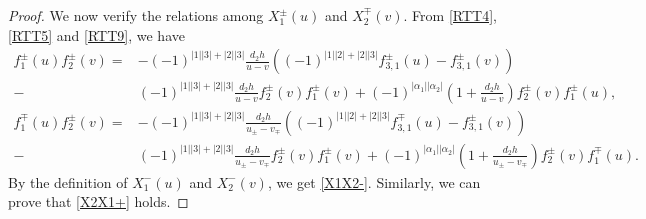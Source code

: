 \documentclass[a4paper,12pt]{article}
\numberwithin{equation}{section}
\begin{document}
\begin{proof}
We now verify the relations among $X_{1}^{\pm}(u)$ and $X_{2}^{\mp}(v)$. From \eqref{RTT4}, \eqref{RTT5} and \eqref{RTT9}, we have
\begin{align*}
f_{1}^{\pm}(u)f_{2}^{\pm}(v)=&-(-1)^{|1||3|+|2||3|}\frac{d_{2}h}{u-v}
\left((-1)^{|1||2|+|2||3|}f_{3,1}^{\pm}(u)-f_{3,1}^{\pm}(v)\right)\\
-&(-1)^{|1||3|+|2||3|}\frac{d_{2}h}{u-v}
f_{2}^{\pm}(v)f_{1}^{\pm}(v)+(-1)^{|\alpha_{1}||\alpha_{2}|}\left(1+\frac{d_{2}h}{u-v}\right)
f_{2}^{\pm}(v)f_{1}^{\pm}(u),\\
f_{1}^{\mp}(u)f_{2}^{\pm}(v)=&-(-1)^{|1||3|+|2||3|}\frac{d_{2}h}{u_{\pm}-v_{\mp}}
\left((-1)^{|1||2|+|2||3|}f_{3,1}^{\mp}(u)-f_{3,1}^{\pm}(v)\right)\\
-&(-1)^{|1||3|+|2||3|}\frac{d_{2}h}
{u_{\pm}-v_{\mp}}f_{2}^{\pm}(v)f_{1}^{\pm}(v)+(-1)^{|\alpha_{1}||\alpha_{2}|}\left(1+\frac{d_{2}h}{u_{\pm}-v_{\mp}}\right)
f_{2}^{\pm}(v)f_{1}^{\mp}(u).
\end{align*}
By the definition of $X_{1}^{-}(u)$ and $X_{2}^{-}(v)$, we get \eqref{X1X2-}. Similarly, we can prove that \eqref{X2X1+} holds.


\end{proof}
\end{document}

